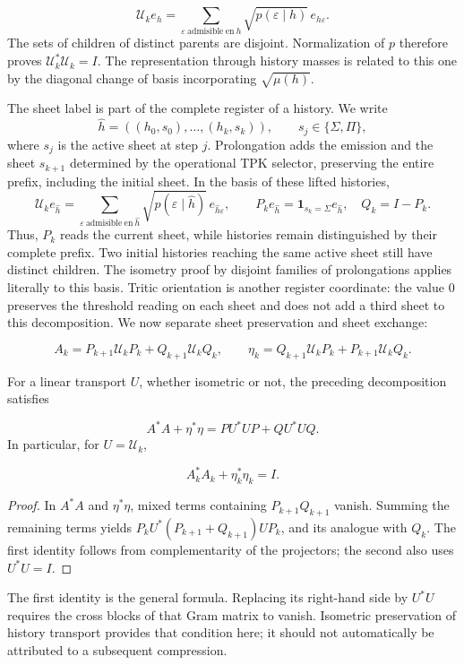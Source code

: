 \[
\mathcal U_ke_h=
\sum_{\varepsilon\ \mathrm{admisible\ en}\ h}
\sqrt{p(\varepsilon\mid h)}\,e_{h\varepsilon}.
\]
The sets of children of distinct parents are disjoint. Normalization of \(p\) therefore proves \(\mathcal U_k^*\mathcal U_k=I\). The representation through history masses is related to this one by the diagonal change of basis incorporating \(\sqrt{\mu(h)}\).

The sheet label is part of the complete register of a history. We write
\[
\widehat h=((h_0,s_0),\ldots,(h_k,s_k)),\qquad
s_j\in\{\Sigma,\Pi\},
\]
where \(s_j\) is the active sheet at step \(j\). Prolongation adds the emission and the sheet \(s_{k+1}\) determined by the operational TPK selector, preserving the entire prefix, including the initial sheet. In the basis of these lifted histories,
\[
\mathcal U_ke_{\widehat h}
=\sum_{\varepsilon\ \mathrm{admisible\ en}\ \widehat h}
\sqrt{p(\varepsilon\mid\widehat h)}\,e_{\widehat h\varepsilon},
\qquad
P_ke_{\widehat h}=\mathbf1_{s_k=\Sigma}e_{\widehat h},\quad
Q_k=I-P_k.
\]
Thus, \(P_k\) reads the current sheet, while histories remain distinguished by their complete prefix. Two initial histories reaching the same active sheet still have distinct children. The isometry proof by disjoint families of prolongations applies literally to this basis.
Tritic orientation is another register coordinate: the value \(0\) preserves the threshold reading on each sheet and does not add a third sheet to this decomposition. We now separate sheet preservation and sheet exchange:

\[
A_k=P_{k+1}\mathcal U_kP_k+Q_{k+1}\mathcal U_kQ_k,
\qquad
\eta_k=Q_{k+1}\mathcal U_kP_k+P_{k+1}\mathcal U_kQ_k.
\]
\begin{proposition}
\label{x_reciprocidad:iv:cont:gram}
For a linear transport \(U\), whether isometric or not, the preceding decomposition satisfies

\[
A^*A+\eta^*\eta=PU^*UP+QU^*UQ.
\]
In particular, for \(U=\mathcal U_k\),

\[
A_k^*A_k+\eta_k^*\eta_k=I.
\]
\end{proposition}
\begin{proof}
In \(A^*A\) and \(\eta^*\eta\), mixed terms containing \(P_{k+1}Q_{k+1}\) vanish. Summing the remaining terms yields \(P_kU^*(P_{k+1}+Q_{k+1})UP_k\), and its analogue with \(Q_k\). The first identity follows from complementarity of the projectors; the second also uses \(U^*U=I\).
\end{proof}

The first identity is the general formula. Replacing its right-hand side by \(U^*U\) requires the cross blocks of that Gram matrix to vanish. Isometric preservation of history transport provides that condition here; it should not automatically be attributed to a subsequent compression.

